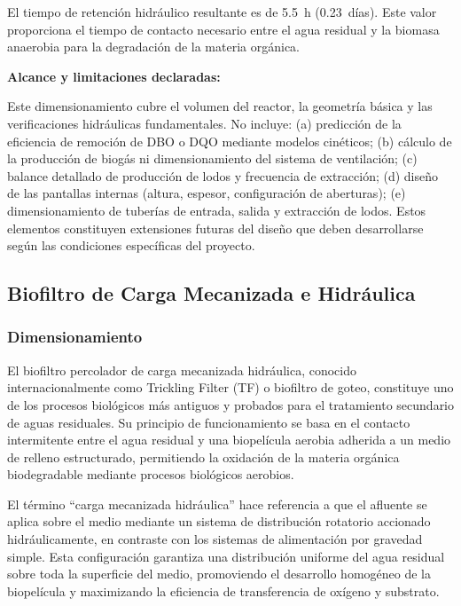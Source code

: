 \documentclass[12pt,a4paper]{article}
\begin{document}
El tiempo de retención hidráulico resultante es de 5.5~h (0.23~días). Este valor proporciona el tiempo de contacto necesario entre el agua residual y la biomasa anaerobia para la degradación de la materia orgánica.

\textbf{Alcance y limitaciones declaradas:}

Este dimensionamiento cubre el volumen del reactor, la geometría básica y las verificaciones hidráulicas fundamentales. No incluye: (a) predicción de la eficiencia de remoción de DBO o DQO mediante modelos cinéticos; (b) cálculo de la producción de biogás ni dimensionamiento del sistema de ventilación; (c) balance detallado de producción de lodos y frecuencia de extracción; (d) diseño de las pantallas internas (altura, espesor, configuración de aberturas); (e) dimensionamiento de tuberías de entrada, salida y extracción de lodos. Estos elementos constituyen extensiones futuras del diseño que deben desarrollarse según las condiciones específicas del proyecto.

\subsection{Biofiltro de Carga Mecanizada e Hidráulica}

\subsubsection{Dimensionamiento}

El biofiltro percolador de carga mecanizada hidráulica, conocido internacionalmente como Trickling Filter (TF) o biofiltro de goteo, constituye uno de los procesos biológicos más antiguos y probados para el tratamiento secundario de aguas residuales. Su principio de funcionamiento se basa en el contacto intermitente entre el agua residual y una biopelícula aerobia adherida a un medio de relleno estructurado, permitiendo la oxidación de la materia orgánica biodegradable mediante procesos biológicos aerobios.

El término ``carga mecanizada hidráulica'' hace referencia a que el afluente se aplica sobre el medio mediante un sistema de distribución rotatorio accionado hidráulicamente, en contraste con los sistemas de alimentación por gravedad simple. Esta configuración garantiza una distribución uniforme del agua residual sobre toda la superficie del medio, promoviendo el desarrollo homogéneo de la biopelícula y maximizando la eficiencia de transferencia de oxígeno y substrato.
\end{document}
